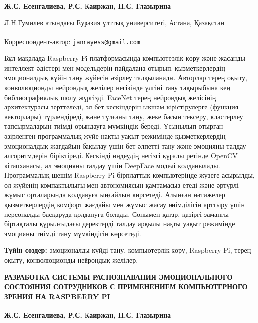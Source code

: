 
\begin{articleheader}

{\bfseries
Ж.С. Есенгалиева\textsuperscript{\envelope },
Р.С. Каиржан,
Н.С. Глазырина
}
\end{articleheader}
\vspace{0.3em}
\begin{affiliation}
Л.Н.Гумилев атындағы Еуразия ұлттық университеті, Астана, Қазақстан

\raggedright \textsuperscript{\envelope }Корреспондент-автор:
\href{mailto:jannayess@gmail.com}{\nolinkurl{jannayess@gmail.com}}
\end{affiliation}

Бұл мақалада Raspberry Pi платформасында компьютерлік көру және жасанды
интеллект әдістері мен модельдерін пайдалана отырып, қызметкерлердің
эмоционалдық күйін тану жүйесін әзірлеу талқыланады. Авторлар терең
оқыту, конволюционды нейрондық желілер негізінде үлгіні тану тақырыбына
кең библиографиялық шолу жүргізді. FaceNet терең нейрондық желісінің
архитектурасы зерттеледі, ол бет кескіндерін ықшам кірістірулерге
(функция векторлары) түрлендіреді, және тұлғаны тану, жеке басын
тексеру, кластерлеу тапсырмаларын тиімді орындауға мүмкіндік береді.
Ұсынылып отырған әзірленген программалық жүйе нақты уақыт режимінде
қызметкерлердің эмоционалдық жағдайын бақылау үшін бет-әлпетті тану және
эмоцияны талдау алгоритмдерін біріктіреді. Кескінді өңдеудің негізгі
құралы ретінде OpenCV кітапханасы, ал эмоцияны талдау үшін DeepFace
моделі қолданылады. Программалық шешім Raspberry Pi бірплаттық
компьютерінде жүзеге асырылды, ол жүйенің компактылығы мен автономиясын
қамтамасыз етеді және әртүрлі жұмыс орталарында қолдануға ыңғайлын
көрсетеді. Алынған нәтижелер қызметкерлердің комфорт жағдайы мен жұмыс
жасау өнімділігін арттыру үшін персоналды басқаруда қолдануға болады.
Сонымен қатар, қазіргі заманғы біртақталы құрылғыдағы деректерді талдау
арқылы нақты уақыт режимінде эмоцияны тиімді тану мүмкіндігін көрсетеді.

{\bfseries Түйін сөздер:} эмоционалды күйді тану, компьютерлік көру,
Raspberry Pi, терең оқыту, конволюционды нейрондық желілер.

\begin{articleheader}
{\bfseries РАЗРАБОТКА СИСТЕМЫ РАСПОЗНАВАНИЯ ЭМОЦИОНАЛЬНОГО СОСТОЯНИЯ
СОТРУДНИКОВ С ПРИМЕНЕНИЕМ КОМПЬЮТЕРНОГО ЗРЕНИЯ НА RASPBERRY PI}

{\bfseries
Ж.С. Есенгалиева\textsuperscript{\envelope },
Р.С. Каиржан,
Н.С. Глазырина
}
\end{articleheader}

